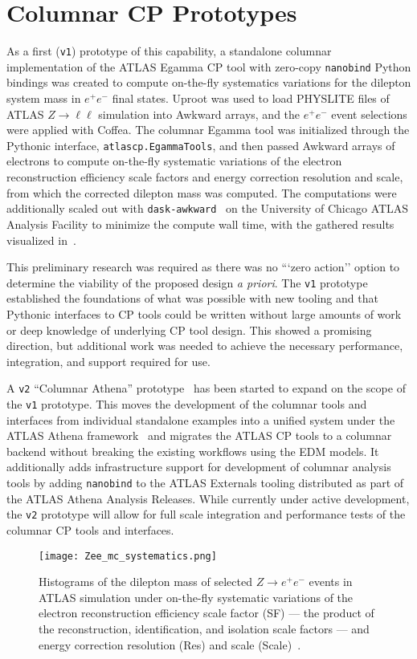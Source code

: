 \section{Columnar CP Prototypes}\label{sec:prototypes}

As a first (\texttt{v1}) prototype of this capability, a standalone columnar implementation of the ATLAS Egamma CP tool with zero-copy \texttt{nanobind} Python bindings was created to compute on-the-fly systematics variations for the dilepton system mass in $e^{+}e^{-}$ final states.
Uproot was used to load PHYSLITE files of ATLAS $Z\to \ell\ell$ simulation into Awkward arrays, and the $e^{+}e^{-}$ event selections were applied with Coffea.
The columnar Egamma tool was initialized through the Pythonic interface, \texttt{atlascp.EgammaTools}, and then passed Awkward arrays of electrons to compute on-the-fly systematic variations of the electron reconstruction efficiency scale factors and energy correction resolution and scale, from which the corrected dilepton mass was computed.
The computations were additionally scaled out with \texttt{dask-awkward}~\cite{dask_awkward_2024} on the University of Chicago ATLAS Analysis Facility to minimize the compute wall time, with the gathered results visualized in~.

This preliminary research was required as there was no ```zero action'' option to determine the viability of the proposed design \textit{a priori}.
The \texttt{v1} prototype established the foundations of what was possible with new tooling and that Pythonic interfaces to CP tools could be written without large amounts of work or deep knowledge of underlying CP tool design.
This showed a promising direction, but additional work was needed to achieve the necessary performance, integration, and support required for use.

A \texttt{v2} ``Columnar Athena'' prototype~\cite{columnar_athena} has been started to expand on the scope of the \texttt{v1} prototype.
This moves the development of the columnar tools and interfaces from individual standalone examples into a unified system under the ATLAS Athena framework~\cite{ATLAS_Athena} and migrates the ATLAS CP tools to a columnar backend without breaking the existing workflows using the EDM models.
It additionally adds infrastructure support for development of columnar analysis tools by adding \texttt{nanobind} to the ATLAS Externals tooling distributed as part of the ATLAS Athena Analysis Releases.
While currently under active development, the \texttt{v2} prototype will allow for full scale integration and performance tests of the columnar CP tools and interfaces.

\begin{figure}
    \centering
    \texttt{[image: Zee\_mc\_systematics.png]}
    \caption{Histograms of the dilepton mass of selected $Z\to e^{+}e^{-}$ events in ATLAS simulation under on-the-fly systematic variations of the electron reconstruction efficiency scale factor (SF) --- the product of the reconstruction, identification, and isolation scale factors --- and energy correction resolution (Res) and scale (Scale)~\cite{Vigl:ACAT_2024}.}
    \label{fig:Zee_mc_systematics}
\end{figure}
